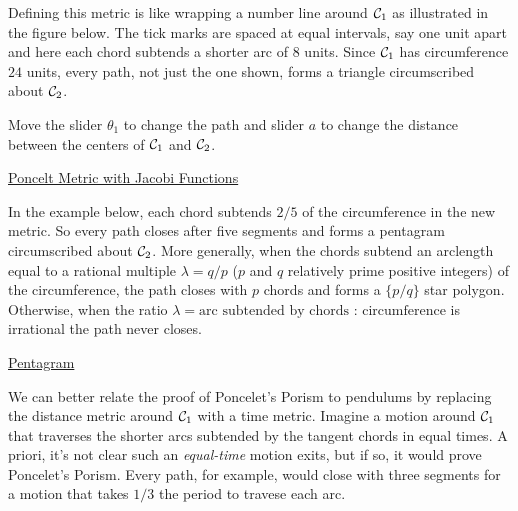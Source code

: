 \documentclass{ximera}
\begin{document}
Defining this metric is like wrapping a number line around ${\cal C}_1$ as illustrated in the figure below. The tick marks are spaced at equal intervals, say one unit apart and here each chord subtends a shorter arc of $8$ units. Since ${\cal C}_1$ has circumference $24$ units, every path, not just the one shown, forms a triangle circumscribed about ${\cal C}_2$.  

\begin{exploration}
Move the slider $\theta_1$ to change the path and slider $a$ to change the distance between the centers of ${\cal C}_1$ and ${\cal C}_2$.
 
\begin{onlineOnly}
    \begin{center}
\end{center}
\end{onlineOnly}

\href{https://www.desmos.com/calculator/wzctareiln}{Poncelt Metric with Jacobi Functions}

\end{exploration}

In the example below, each chord subtends $2/5$ of the circumference in the new metric. So every path closes after five segments and forms a pentagram circumscribed about ${\cal C}_2$. More generally, when the chords subtend an arclength equal to a rational multiple $\lambda = q/p$ ($p$ and $q$ relatively prime positive integers) of the circumference, the path closes with $p$ chords and forms a $\{p/q \}$ star polygon. Otherwise, when the ratio $\lambda = \text{arc subtended by chords : circumference}$ is irrational the path never closes.

\begin{exploration}
\begin{onlineOnly}
    \begin{center}
\end{center}
\end{onlineOnly}

\href{https://www.desmos.com/calculator/qco4rghhfi}{Pentagram}

\end{exploration}

We can better relate the proof of Poncelet's Porism to pendulums by replacing the distance metric around ${\cal C}_1$ with a time metric. Imagine a motion around ${\cal C}_1$ that traverses the shorter arcs subtended by the tangent chords in equal times. A priori, it's not clear such an \emph{equal-time} motion exits, but if so, it would prove Poncelet's Porism. Every path, for example, would close with three segments for a motion that takes $1/3$ the period to travese each arc. %
\end{document}
